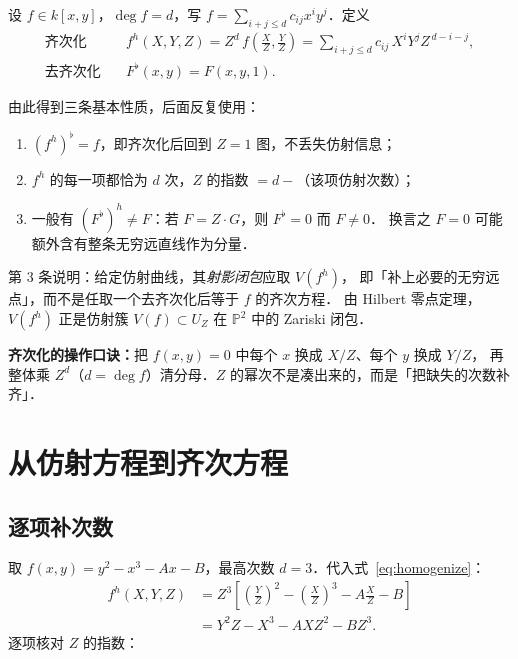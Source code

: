 \documentclass[10pt,a4paper]{article}
\numberwithin{equation}{section}
\begin{document}
\begin{definition}[齐次化与去齐次化]
设 $f\in k[x,y]$，$\deg f=d$，写 $f=\sum_{i+j\leq d}c_{ij}x^{i}y^{j}$．定义
\begin{align}
\text{齐次化}\quad & f^{h}(X,Y,Z)=Z^{d}\,f\!\left(\frac{X}{Z},\frac{Y}{Z}\right)
   =\sum_{i+j\leq d}c_{ij}\,X^{i}Y^{j}Z^{\,d-i-j},\label{eq:homogenize}\\[2mm]
\text{去齐次化}\quad & F^{\flat}(x,y)=F(x,y,1).\label{eq:dehomogenize}
\end{align}
\end{definition}

由此得到三条基本性质，后面反复使用：

\begin{enumerate}
\item $(f^{h})^{\flat}=f$，即齐次化后回到 $Z=1$ 图，不丢失仿射信息；
\item $f^{h}$ 的每一项都恰为 $d$ 次，$Z$ 的指数 $=d-$（该项仿射次数）；
\item 一般有 $(F^{\flat})^{h}\neq F$：若 $F=Z\cdot G$，则 $F^{\flat}=0$ 而 $F\neq0$．
   换言之 $F=0$ 可能额外含有整条无穷远直线作为分量．
\end{enumerate}

第 3 条说明：给定仿射曲线，其\emph{射影闭包}应取 $V(f^{h})$，
即「补上必要的无穷远点」，而不是任取一个去齐次化后等于 $f$ 的齐次方程．
由 Hilbert 零点定理，$V(f^{h})$ 正是仿射簇 $V(f)\subset U_{Z}$ 在 $\mathbb P^{2}$ 中的 Zariski 闭包．

\begin{framed}
\noindent\textbf{齐次化的操作口诀：}把 $f(x,y)=0$ 中每个 $x$ 换成 $X/Z$、每个 $y$ 换成 $Y/Z$，
再整体乘 $Z^{d}$（$d=\deg f$）清分母．$Z$ 的幂次不是凑出来的，而是「把缺失的次数补齐」．
\end{framed}

\section{从仿射方程到齐次方程}\label{sec:homogenize}

\subsection{逐项补次数}

取 $f(x,y)=y^{2}-x^{3}-Ax-B$，最高次数 $d=3$．代入式~\eqref{eq:homogenize}：
\begin{equation}\label{eq:homogenize-calc}
\begin{aligned}
f^{h}(X,Y,Z)
 &=Z^{3}\left[\left(\frac{Y}{Z}\right)^{2}
   -\left(\frac{X}{Z}\right)^{3}
   -A\frac{X}{Z}-B\right]\\
 &=Y^{2}Z-X^{3}-AXZ^{2}-BZ^{3}.
\end{aligned}
\end{equation}
逐项核对 $Z$ 的指数：
\end{document}
